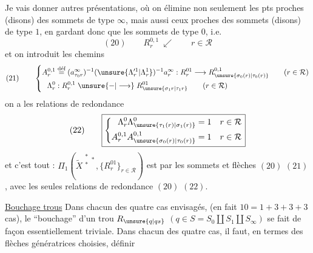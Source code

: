 
Je vais donner   autres présentations, où on élimine non seulement les pts proches (disons) des  sommets de type $\infty$,  mais aussi ceux proches des sommets (disons) de type $1$, en gardant donc que les sommets  de type $0$, i.e.
\[
(20)\qquad R_r^{0,1}\ \swarrow\qquad r\in\mathcal{R}
\]
et on introduit les chemins
\[
(21)\qquad\left\{\begin{aligned}
A_r^{0,1}&\overset{\text{déf}}{=}(a_{\tau_0r}^\infty)^{-1}(\unsure{\Lambda_r^{\prime1}|\Lambda_r^1})^{-1}a_r^\infty:R_r^{01}\longrightarrow R_{\unsure{\sigma_0(r)|\tau_0(r)}}^{0,1}\qquad(r\in\mathcal{R})\\
\Lambda_r^0&:R_r^{0,1}\mathrel{\unsure{-|\longrightarrow}} R_{\unsure{\sigma_1r|\tau_1r}}^{01}\qquad(r\in\mathcal{R})
\end{aligned}\right.
\]
on a les relations de redondance
\[
(22)\qquad\boxed{\left\{\begin{aligned}
\Lambda_r^0\Lambda_{\unsure{\tau_1(r)|\sigma_1(r)}}^0&=1&&r\in\mathcal{R}\\
A_r^{0,1}A_{\unsure{\sigma_0(r)|\tau_0(r)}}^{0,1}&=1&&r\in\mathcal{R}
\end{aligned}\right.}
\]
et c'est tout : $\Pi_1(\widetilde{X}^{\substack{*\\*}*},\{R_r^{01}\}_{r\in\mathcal{R}})$ est   par les sommets et flèches $(20)$ $(21)$, avec les seules relations de redondance $(20)$ $(22)$.

\uline{Bouchage  trous} Dans chacun des quatre cas envisagés, (en fait $10=1+3+3+3$ cas), le ``bouchage'' d'un trou $R_{\unsure{q|qs}}$ $(q\in S=S_0\amalg S_1\amalg S_\infty)$ se fait de façon essentiellement triviale. Dans chacun des quatre cas, il faut, en termes des flèches génératrices choisies, définir 

